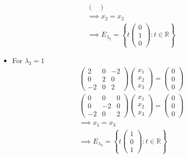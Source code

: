 \begin{itemize}
\begin{gather}
\begin{pmatrix}
\end{pmatrix}\\
\implies x_2 = x_2\\
\implies E_{\lambda_2} = \left\{
t\begin{pmatrix}0\\1\\0\end{pmatrix}\colon t \in \mathbb{R}
\right\}
\end{gather}
\item For $\lambda_3 = 1$
\begin{gather}
\begin{pmatrix}
2  & 0  & -2\\
0  & 2  & 0\\
-2 & 0  & 2
\end{pmatrix}
\begin{pmatrix}
x_1\\x_2\\x_3
\end{pmatrix}
=
\begin{pmatrix}
0\\0\\0
\end{pmatrix}\\
\begin{pmatrix}
0 & 0 & 0\\
0  & -2  & 0\\
-2 & 0  & 2
\end{pmatrix}
\begin{pmatrix}
x_1\\x_2\\x_3
\end{pmatrix}
=
\begin{pmatrix}
0\\0\\0
\end{pmatrix}\\
\implies x_1 = x_3\\
\implies E_{\lambda_3} = \left\{
t\begin{pmatrix}1\\0\\1\end{pmatrix}\colon t \in \mathbb{R}
\right\}
\end{gather}
\end{itemize}
